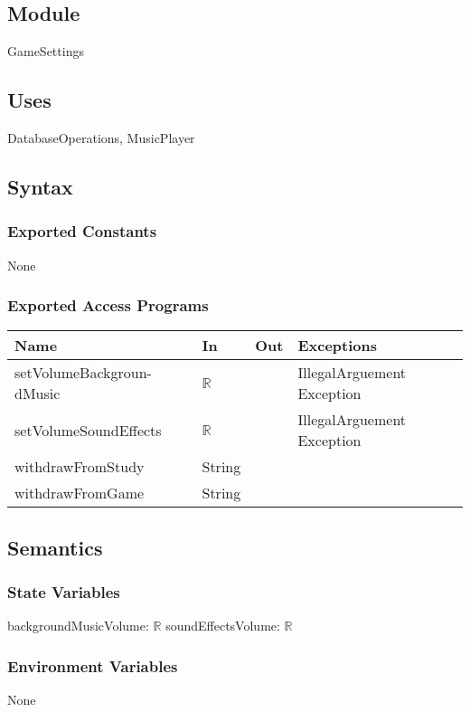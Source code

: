 \documentclass[12pt, titlepage]{article}
\begin{document}
\subsection{Module}
GameSettings

\subsection{Uses}
DatabaseOperations, MusicPlayer


\subsection{Syntax}

\subsubsection{Exported Constants}
None

\subsubsection{Exported Access Programs}

\begin{center}
\begin{tabular}{p{4cm} p{4cm} p{4cm} p{2cm}}
\hline
\textbf{Name} & \textbf{In} & \textbf{Out} & \textbf{Exceptions} \\
\hline
setVolumeBackgroun-dMusic & $\mathbb{R}$  &  & IllegalArguement
Exception \\
\hline
setVolumeSoundEffects & $\mathbb{R}$  &  & IllegalArguement
Exception \\
\hline
withdrawFromStudy & String  &  & \\
\hline
withdrawFromGame & String &  & \\
\hline
\end{tabular}
\end{center}

\subsection{Semantics}

\subsubsection{State Variables}
backgroundMusicVolume: $\mathbb{R}$
soundEffectsVolume: $\mathbb{R}$
\subsubsection{Environment Variables}
None
\end{document}

